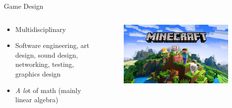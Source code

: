 \documentclass{beamer}
\begin{document}
\begin{frame}{Game Design}
\begin{columns}
	\begin{column}{.45\textwidth}
		\begin{itemize}
			\item Multidisciplinary
			\item Software engineering, art design, sound design, networking, testing, graphics design
			\item \emph{A lo}t of math (mainly linear algebra)
		\end{itemize}
	\end{column}
	\begin{column}{.55\textwidth}
		\begin{figure}
			\includegraphics[width=\linewidth]{img/mc.jpg}
		\end{figure}
	\end{column}
\end{columns}
\end{frame}
\end{document}
